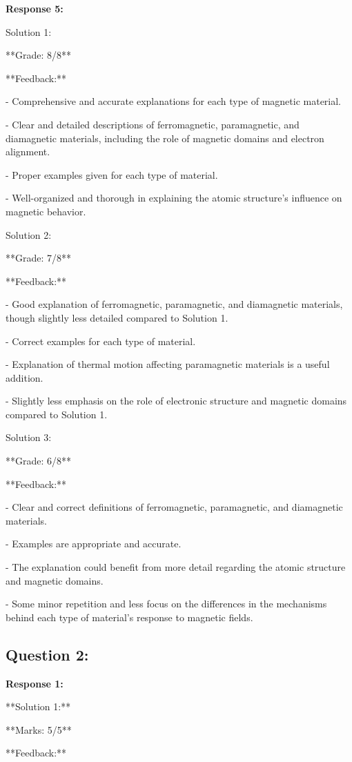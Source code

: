 \documentclass[a4paper,11pt]{article}
\begin{document}
\bigskip
\textbf{Response 5:}

Solution 1:

**Grade: 8/8**

**Feedback:**

- Comprehensive and accurate explanations for each type of magnetic material.

- Clear and detailed descriptions of ferromagnetic, paramagnetic, and diamagnetic materials, including the role of magnetic domains and electron alignment.

- Proper examples given for each type of material.

- Well-organized and thorough in explaining the atomic structure's influence on magnetic behavior.

Solution 2:

**Grade: 7/8**

**Feedback:**

- Good explanation of ferromagnetic, paramagnetic, and diamagnetic materials, though slightly less detailed compared to Solution 1.

- Correct examples for each type of material.

- Explanation of thermal motion affecting paramagnetic materials is a useful addition.

- Slightly less emphasis on the role of electronic structure and magnetic domains compared to Solution 1.

Solution 3:

**Grade: 6/8**

**Feedback:**

- Clear and correct definitions of ferromagnetic, paramagnetic, and diamagnetic materials.

- Examples are appropriate and accurate.

- The explanation could benefit from more detail regarding the atomic structure and magnetic domains.

- Some minor repetition and less focus on the differences in the mechanisms behind each type of material's response to magnetic fields.

\subsection*{Question 2:}

\textbf{Response 1:}

**Solution 1:**

**Marks: 5/5**

**Feedback:**
\end{document}
